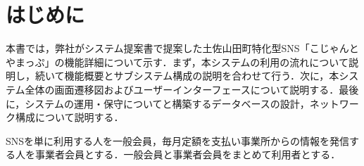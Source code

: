 \section{はじめに}
本書では，弊社がシステム提案書で提案した土佐山田町特化型SNS「こじゃんとやまっぷ」の機能詳細について示す．まず，本システムの利用の流れについて説明し，続いて機能概要とサブシステム構成の説明を合わせて行う．次に，本システム全体の画面遷移図およびユーザーインターフェースについて説明する．最後に，システムの運用・保守についてと構築するデータベースの設計，ネットワーク構成について説明する．

SNSを単に利用する人を一般会員，毎月定額を支払い事業所からの情報を発信する人を事業者会員とする．一般会員と事業者会員をまとめて利用者とする．